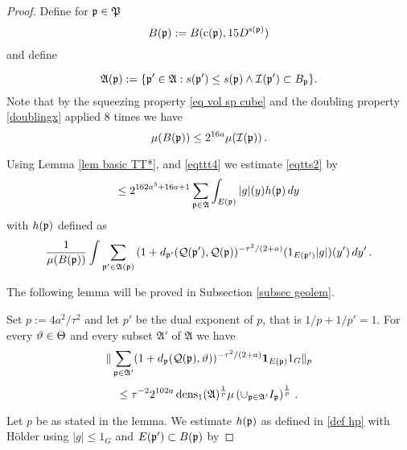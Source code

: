 \begin{proof}
Define for $\mathfrak p\in \mathfrak P$
\begin{equation}
B(\mathfrak p):=B(\mathrm{c}(\mathfrak p), 15D^{\mathrm{s}(\mathfrak p)})
\end{equation}
and define

    \begin{equation}
        \label{eq Dp definition}
        \mathfrak{A}(\mathfrak p):=\{\mathfrak p'\in\mathfrak{A}: s(\mathfrak p')\leq s(\mathfrak p) \land  \mathcal{I}(\mathfrak p') \subset B_{\mathfrak p}\}.
    \end{equation}
Note that by the squeezing property \eqref{eq vol sp cube}
and the doubling property \eqref{doublingx} applied
$8$ times we have
\begin{equation}\label{eqttt4}
    \mu(B(\mathfrak p))\le 2^{16a} \mu(\mathcal{I}(\mathfrak p))\, .
\end{equation}

    Using Lemma \ref{lem basic TT*}, and \eqref{eqttt4} we estimate \eqref{eqtts2} by
    \begin{equation}\label{eqtts3}
    \le  2^{162a^3+16a+1} \sum_{\mathfrak p\in \mathfrak{A}}
    \int_{E(\mathfrak p)}|g|(y) h(\mathfrak p)\, dy
            \end{equation}
with $h(\mathfrak p)$ defined as
\begin{equation}\label{def hp}
    \frac 1{\mu(B(\mathfrak p))}\int \sum_{\mathfrak p'\in \mathfrak{A}(\mathfrak p)}
{(1+d_{\mathfrak p'}(\mathcal{Q}(\mathfrak p'), \mathcal{Q}(\mathfrak p))^{-\tau^2/(2+a)}}(1_{E(\mathfrak p')}|g|)(y')\, dy'\,.
\end{equation}

    The following lemma will be proved in Subsection \ref{subsec geolem}.
\begin{lemma}
\label{lem antichain 1}
Set $p:=4a^2/\tau^2$ and let $p'$ be the dual exponent of $p$, that is $1/p+1/p'=1$.
For  every $\vartheta\in\Theta$ and every subset $\mathfrak{A}'$ of $\mathfrak{A}$ we have
\begin{equation}
    \label{eq antichain Lp}
    \|\sum_{\mathfrak p\in\mathfrak{A}'}(1+d_{\mathfrak p}(\mathcal{Q}(\mathfrak p), \vartheta))^{-\tau^2/(2+a)}\mathbf{1}_{E(\mathfrak p)}1_G\|_{p}
    \end{equation}
    \begin{equation}
    \le \tau^{-2}
2^{102a}\operatorname{\operatorname{dens}}_1(\mathfrak{A})^{\frac 1p}\mu\left(\cup_{\mathfrak p\in\mathfrak{A}'}I_{\mathfrak p}\right)^{\frac 1p}\, .
\end{equation}
\end{lemma}

Let $p$ be as stated in the lemma.
    We estimate $h(\mathfrak p)$ as defined in \eqref{def hp} with H\"older using  $|g|\le 1_G$ and $E(\mathfrak p')\subset B(\mathfrak p)$ by


\end{proof}
